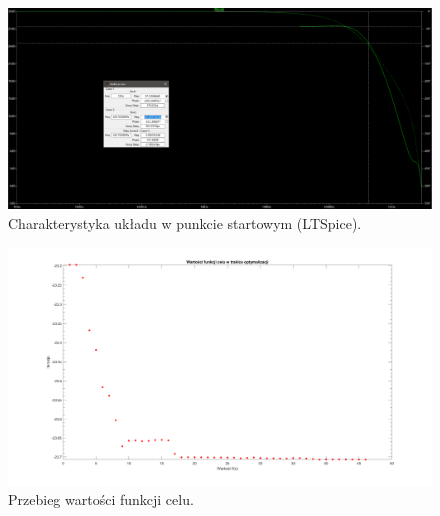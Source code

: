 \documentclass{article}
\begin{document}
\pagebreak
\begin{landscape}
	\begin{figure}[h]
		\vspace*{-2cm}
		\includegraphics[width=20cm,height=10 cm]{graphics/starting_point_spice.png}
		\centering
		\caption{Charakterystyka układu w punkcie startowym (LTSpice).}
	\end{figure}
\end{landscape}

\pagebreak
\begin{landscape}
	\begin{figure}[h]
		\vspace*{-2cm}
		\includegraphics[width=25cm,height=15 cm]{graphics/fval.png}
		\centering
		\caption{Przebieg wartości funkcji celu.}
	\end{figure}
\end{landscape}
\end{document}
